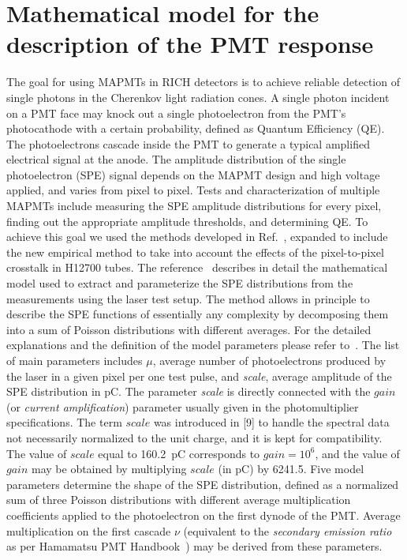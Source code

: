 \section{Mathematical model for the description of the PMT response}

The goal for using MAPMTs in RICH detectors is to achieve reliable detection of single photons in the Cherenkov light radiation cones. A single photon incident on a PMT face may knock out a single photoelectron from the PMT's photocathode with a certain probability, defined as Quantum Efficiency (QE). The photoelectrons cascade inside the PMT to generate a typical amplified electrical signal at the anode. The amplitude distribution of the single photoelectron (SPE) signal depends on the MAPMT design and high voltage applied, and varies from pixel to pixel. Tests and characterization of multiple MAPMTs include measuring the SPE amplitude distributions for every pixel, finding out the appropriate amplitude thresholds, and determining QE. To achieve this goal we used the methods developed in Ref.~\cite{DEGTIARENKO20171}, expanded to include the new empirical method to take into account the effects of the pixel-to-pixel crosstalk in H12700 tubes. The reference~\cite{DEGTIARENKO20171} describes in detail the mathematical model used to extract and parameterize the SPE distributions from the measurements using the laser test setup. The method allows in principle to describe the SPE functions of essentially any complexity by decomposing them into a sum of Poisson distributions with different averages. For the detailed explanations and the definition of the model parameters please refer to~\cite{DEGTIARENKO20171}. The list of main parameters includes $\mu$, average number of photoelectrons produced by the laser in a given pixel per one test pulse, and {\it{scale}}, average amplitude of the SPE distribution in pC. 
The parameter {\it{scale}} is directly connected with the $gain$ (or {\it{current amplification}}) parameter usually given in the photomultiplier specifications. The term $scale$ was introduced in [9] to handle the spectral data not necessarily normalized to the unit charge, and it is kept for compatibility. The value of $scale$ equal to 160.2~pC corresponds to $gain=10^6$, and the value of $gain$ may be obtained by multiplying $scale$ (in pC) by 6241.5.
Five model parameters determine the shape of the SPE distribution, defined as a normalized sum of three Poisson distributions with different average multiplication coefficients  applied to the photoelectron on the first dynode of the PMT. Average multiplication on the first cascade ${\nu}$ (equivalent to the {\it secondary emission ratio} as per Hamamatsu PMT Handbook~\cite{Hamamatsu4thedition}) may be derived from these parameters. 
